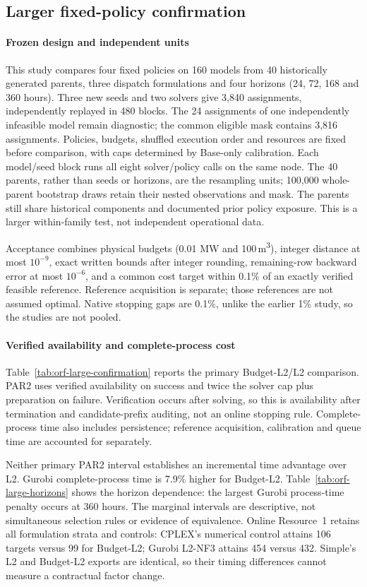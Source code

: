 \subsection{Larger fixed-policy confirmation}
\label{subsec:orf-large-confirmation}
\paragraph{Frozen design and independent units}
This study compares four fixed policies on 160 models from 40 historically
generated parents, three dispatch formulations and four horizons (24, 72, 168
and 360 hours). Three new seeds and two solvers give 3,840 assignments,
independently replayed in 480 blocks. The 24 assignments of one independently
infeasible model remain diagnostic; the common eligible mask contains 3,816
assignments. Policies, budgets, shuffled execution order and resources are fixed
before comparison, with caps determined by Base-only calibration.
Each model/seed block runs all eight solver/policy calls on the same node.
The 40 parents, rather than seeds or horizons, are the resampling units;
100,000 whole-parent bootstrap draws retain their nested observations and mask.
The parents still share historical components and documented prior policy
exposure. This is a larger within-family test, not independent operational data.

Acceptance combines physical budgets (0.01 MW and 100\,m\textsuperscript{3}),
integer distance at most $10^{-9}$, exact written bounds after integer rounding,
remaining-row backward error at most $10^{-6}$, and a common cost target within
0.1\% of an exactly verified feasible reference. Reference acquisition is
separate; those references are not assumed optimal. Native stopping gaps are
0.1\%, unlike the earlier 1\% study, so the studies are not pooled.

\paragraph{Verified availability and complete-process cost}
Table~\ref{tab:orf-large-confirmation} reports the primary Budget-L2/L2
comparison. PAR2 uses verified availability on success and twice the solver cap
plus preparation on failure. Verification occurs after solving, so this is
availability after termination and candidate-prefix auditing, not an online
stopping rule. Complete-process time also includes persistence; reference
acquisition, calibration and queue time are accounted for separately.

Neither primary PAR2 interval establishes an incremental time advantage over
L2. Gurobi complete-process time is 7.9\% higher for Budget-L2.
Table~\ref{tab:orf-large-horizons} shows the horizon dependence: the largest
Gurobi process-time penalty occurs at 360 hours. The marginal intervals are
descriptive, not simultaneous selection rules or evidence of equivalence.
Online Resource~1 retains all formulation strata and controls: CPLEX's numerical
control attains 106 targets versus 99 for Budget-L2; Gurobi L2-NF3 attains 454
versus 432. Simple's L2 and Budget-L2 exports are identical, so their timing
differences cannot measure a contractual factor change.


